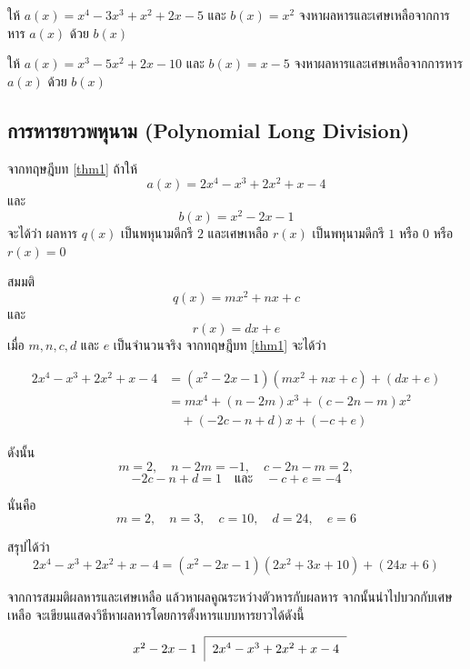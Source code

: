 \begin{examplebox}
ให้ $a(x) = x^{4}-3x^{3}+x^{2}+2x-5$ และ $b(x) = x^{2}$ จงหาผลหารและเศษเหลือจากการหาร $a(x)$ ด้วย $b(x)$
\end{examplebox}
\solution
\vspace{3cm}

\begin{examplebox}
ให้ $a(x) = x^{3}-5x^{2}+2x-10$ และ $b(x) = x-5$ จงหาผลหารและเศษเหลือจากการหาร $a(x)$ ด้วย $b(x)$
\end{examplebox}
\solution

\newpage

\subsection*{การหารยาวพหุนาม (Polynomial Long Division)}

\begin{observationbox}
	จากทฤษฎีบท \ref{thm1} ถ้าให้
	\[
	a(x)=2x^4-x^3+2x^2+x-4
	\]
	และ
	\[
	b(x)=x^2-2x-1
	\]
	จะได้ว่า ผลหาร $q(x)$ เป็นพหุนามดีกรี $2$ และเศษเหลือ $r(x)$ เป็นพหุนามดีกรี $1$ หรือ $0$ หรือ $r(x)=0$
	
	\medskip
	
	สมมติ
	\[
	q(x)=mx^2+nx+c
	\]
	และ
	\[
	r(x)=dx+e
	\]
	เมื่อ $m,n,c,d$ และ $e$ เป็นจำนวนจริง จากทฤษฎีบท \ref{thm1} จะได้ว่า
	
	\begin{align*}
		2x^4-x^3+2x^2+x-4
		&=
		(x^2-2x-1)(mx^2+nx+c)+(dx+e)
		\\
		&=
		mx^4+(n-2m)x^3+(c-2n-m)x^2
		\\
		&\quad +(-2c-n+d)x+(-c+e)
	\end{align*}
	
	ดังนั้น
	\[
	m=2,\quad n-2m=-1,\quad c-2n-m=2,
	\]
	\[
	-2c-n+d=1
	\quad \text{และ} \quad
	-c+e=-4
	\]
	
	นั่นคือ
	\[
	m=2,\quad n=3,\quad c=10,\quad d=24,\quad e=6
	\]
	
	สรุปได้ว่า
	\[
	2x^4-x^3+2x^2+x-4
	=
	(x^2-2x-1)(2x^2+3x+10)+(24x+6)
	\]
\end{observationbox}

\newpage
จากการสมมติผลหารและเศษเหลือ แล้วหาผลคูณระหว่างตัวหารกับผลหาร จากนั้นนำไปบวกกับเศษเหลือ จะเขียนแสดงวิธีหาผลหารโดยการตั้งหารแบบหารยาวได้ดังนี้

\[
\begin{tabular}{r|l}
	\cline{2-2}
	$x^2 - 2x - 1$ & $\vphantom{\dfrac{1}{1}} 2x^4 - x^3 + 2x^2 + x - 4$ \\
\end{tabular}
\]

